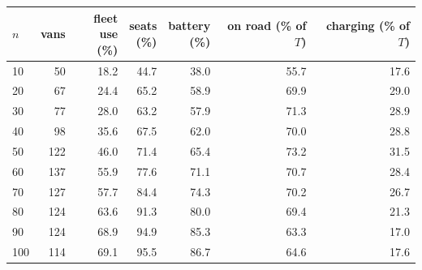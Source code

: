 \begin{tabular}{lrrrrrr}\toprule
$n$ & vans & \shortstack{fleet\\use (\%)} & \shortstack{seats\\(\%)} & \shortstack{battery\\(\%)} & \shortstack{on road\\(\% of $T$)} & \shortstack{charging\\(\% of $T$)} \\ \midrule
10 & 50 & 18.2 & 44.7 & 38.0 & 55.7 & 17.6 \\
20 & 67 & 24.4 & 65.2 & 58.9 & 69.9 & 29.0 \\
30 & 77 & 28.0 & 63.2 & 57.9 & 71.3 & 28.9 \\
40 & 98 & 35.6 & 67.5 & 62.0 & 70.0 & 28.8 \\
50 & 122 & 46.0 & 71.4 & 65.4 & 73.2 & 31.5 \\
60 & 137 & 55.9 & 77.6 & 71.1 & 70.7 & 28.4 \\
70 & 127 & 57.7 & 84.4 & 74.3 & 70.2 & 26.7 \\
80 & 124 & 63.6 & 91.3 & 80.0 & 69.4 & 21.3 \\
90 & 124 & 68.9 & 94.9 & 85.3 & 63.3 & 17.0 \\
100 & 114 & 69.1 & 95.5 & 86.7 & 64.6 & 17.6 \\
\bottomrule\end{tabular}
